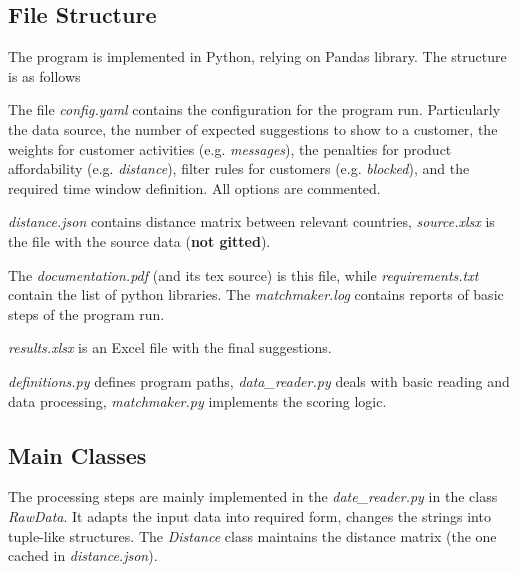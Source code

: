 \documentclass{report}
\begin{document}
\subsection*{File Structure}

The program is implemented in Python, relying on Pandas library. The structure is as follows\\


\vspace{1em}

The file \emph{config.yaml} contains the configuration for the program run. Particularly the data source, the number of
expected suggestions to show to a customer, the weights for customer activities (e.g. \emph{messages}), 
the penalties for product affordability (e.g. \emph{distance}), filter rules for customers (e.g. \emph{blocked}), and 
the required time window definition. All options are commented.

\emph{distance.json} contains distance matrix between relevant countries, \emph{source.xlsx} is the file with the source
data (\textbf{not gitted}).

The \emph{documentation.pdf} (and its tex source) is this file, while \emph{requirements.txt} contain the list of python libraries. 
The \emph{matchmaker.log} contains reports of basic steps of the program run. 

\emph{results.xlsx} is an Excel file with the final suggestions.

\emph{definitions.py} defines program paths, \emph{data\_reader.py} deals with basic reading and data processing, 
\emph{matchmaker.py} implements the scoring logic.

\subsection*{Main Classes}

The processing steps are mainly implemented in the \emph{date\_reader.py} in the class \emph{RawData}. 
It adapts the input data into required form, changes the strings into tuple-like structures. The \emph{Distance} class maintains 
the distance matrix (the one cached in \emph{distance.json}).
\end{document}
